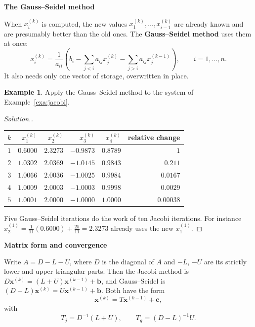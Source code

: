 \documentclass[11pt,a4paper]{article}
\numberwithin{equation}{section}
\theoremstyle{definition}
\newtheorem{exa}[thm]{Example}
\newenvironment{solution}
  {\renewcommand{\qedsymbol}{}\begin{proof}[\textit{Solution}.]}
  {\end{proof}}
\newcommand{\subhead}[1]{%
  \par\medskip\noindent\textbf{#1}\par\nobreak\smallskip}
\begin{document}
\subhead{The Gauss--Seidel method}
When $x_i^{(k)}$ is computed, the new values $x_1^{(k)},\dots,x_{i-1}^{(k)}$ are already known and are presumably better than the old ones.
The \textbf{Gauss--Seidel method} uses them at once:
\begin{equation}\label{eq:gs}
x_i^{(k)} = \frac{1}{a_{ii}}\left(b_i-\sum_{j<i}a_{ij}x_j^{(k)}-\sum_{j>i}a_{ij}x_j^{(k-1)}\right),\qquad i = 1,\dots,n .
\end{equation}
It also needs only one vector of storage, overwritten in place.

\begin{exa}
\label{exa:gs}
Apply the Gauss--Seidel method to the system of Example~\ref{exa:jacobi}.
\end{exa}

\begin{solution}
\begin{center}
\begin{tabular}{rrrrrr}
\hline
$k$ & $x_1^{(k)}$ & $x_2^{(k)}$ & $x_3^{(k)}$ & $x_4^{(k)}$ & relative change\\
\hline
$1$ & $0.6000$ & $2.3273$ & $-0.9873$ & $0.8789$ & $1$\\
$2$ & $1.0302$ & $2.0369$ & $-1.0145$ & $0.9843$ & $0.211$\\
$3$ & $1.0066$ & $2.0036$ & $-1.0025$ & $0.9984$ & $0.0167$\\
$4$ & $1.0009$ & $2.0003$ & $-1.0003$ & $0.9998$ & $0.0029$\\
$5$ & $1.0001$ & $2.0000$ & $-1.0000$ & $1.0000$ & $0.00038$\\
\hline
\end{tabular}
\end{center}
Five Gauss--Seidel iterations do the work of ten Jacobi iterations. For instance $x_2^{(1)} = \frac{1}{11}(0.6000)+\frac{25}{11} = 2.3273$ already
uses the new $x_1^{(1)}$.
\end{solution}

\subhead{Matrix form and convergence}
Write $A = D-L-U$, where $D$ is the diagonal of $A$ and $-L$, $-U$ are its strictly lower and upper triangular parts. Then the Jacobi method is
$D\mathbf x^{(k)} = (L+U)\mathbf x^{(k-1)}+\mathbf b$, and Gauss--Seidel is $(D-L)\mathbf x^{(k)} = U\mathbf x^{(k-1)}+\mathbf b$. Both have the form
\begin{equation}\label{eq:stationary}
\mathbf x^{(k)} = T\mathbf x^{(k-1)}+\mathbf c,
\end{equation}
with
$$T_j = D^{-1}(L+U),\qquad T_g = (D-L)^{-1}U .$$
\end{document}
